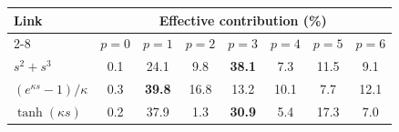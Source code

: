 \begin{tabular}{@{}l*{7}{c}@{}}
\toprule
Link & \multicolumn{7}{c}{Effective contribution (\%)} \\
\cmidrule(lr){2-8}
 & $p=0$ & $p=1$ & $p=2$ & $p=3$ & $p=4$ & $p=5$ & $p=6$ \\
\midrule
\(s^2+s^3\) & 0.1 & 24.1 & 9.8 & \textbf{38.1} & 7.3 & 11.5 & 9.1 \\
\((e^{\kappa s}-1)/\kappa\) & 0.3 & \textbf{39.8} & 16.8 & 13.2 & 10.1 & 7.7 & 12.1 \\
\(\tanh(\kappa s)\) & 0.2 & 37.9 & 1.3 & \textbf{30.9} & 5.4 & 17.3 & 7.0 \\
\bottomrule
\end{tabular}
